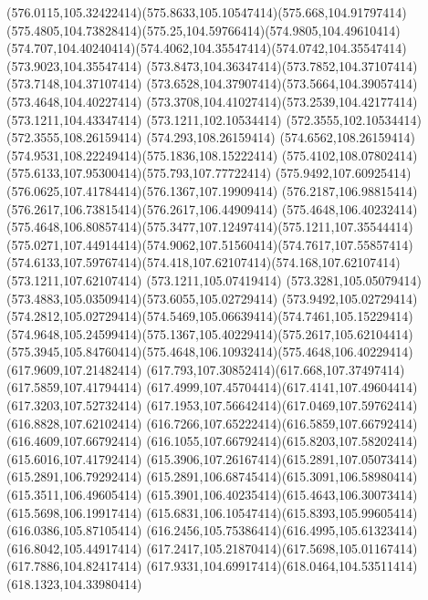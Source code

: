 {{	\curveto(576.0115,105.32422414)(575.8633,105.10547414)(575.668,104.91797414)
	\curveto(575.4805,104.73828414)(575.25,104.59766414)(574.9805,104.49610414)
	\curveto(574.707,104.40240414)(574.4062,104.35547414)(574.0742,104.35547414)
	\lineto(573.9023,104.35547414)
	\curveto(573.8473,104.36347414)(573.7852,104.37107414)(573.7148,104.37107414)
	\curveto(573.6528,104.37907414)(573.5664,104.39057414)(573.4648,104.40227414)
	\curveto(573.3708,104.41027414)(573.2539,104.42177414)(573.1211,104.43347414)
	\lineto(573.1211,102.10534414)
	\lineto(572.3555,102.10534414)
	\lineto(572.3555,108.26159414)
	\lineto(574.293,108.26159414)
	\curveto(574.6562,108.26159414)(574.9531,108.22249414)(575.1836,108.15222414)
	\curveto(575.4102,108.07802414)(575.6133,107.95300414)(575.793,107.77722414)
	\curveto(575.9492,107.60925414)(576.0625,107.41784414)(576.1367,107.19909414)
	\curveto(576.2187,106.98815414)(576.2617,106.73815414)(576.2617,106.44909414)
	\closepath
	\moveto(575.4648,106.40232414)
	\curveto(575.4648,106.80857414)(575.3477,107.12497414)(575.1211,107.35544414)
	\curveto(575.0271,107.44914414)(574.9062,107.51560414)(574.7617,107.55857414)
	\curveto(574.6133,107.59767414)(574.418,107.62107414)(574.168,107.62107414)
	\lineto(573.1211,107.62107414)
	\lineto(573.1211,105.07419414)
	\curveto(573.3281,105.05079414)(573.4883,105.03509414)(573.6055,105.02729414)
	\lineto(573.9492,105.02729414)
	\curveto(574.2812,105.02729414)(574.5469,105.06639414)(574.7461,105.15229414)
	\curveto(574.9648,105.24599414)(575.1367,105.40229414)(575.2617,105.62104414)
	\curveto(575.3945,105.84760414)(575.4648,106.10932414)(575.4648,106.40229414)
	\closepath
	\moveto(617.9609,107.21482414)
	\curveto(617.793,107.30852414)(617.668,107.37497414)(617.5859,107.41794414)
	\curveto(617.4999,107.45704414)(617.4141,107.49604414)(617.3203,107.52732414)
	\curveto(617.1953,107.56642414)(617.0469,107.59762414)(616.8828,107.62102414)
	\curveto(616.7266,107.65222414)(616.5859,107.66792414)(616.4609,107.66792414)
	\curveto(616.1055,107.66792414)(615.8203,107.58202414)(615.6016,107.41792414)
	\curveto(615.3906,107.26167414)(615.2891,107.05073414)(615.2891,106.79292414)
	\curveto(615.2891,106.68745414)(615.3091,106.58980414)(615.3511,106.49605414)
	\curveto(615.3901,106.40235414)(615.4643,106.30073414)(615.5698,106.19917414)
	\curveto(615.6831,106.10547414)(615.8393,105.99605414)(616.0386,105.87105414)
	\curveto(616.2456,105.75386414)(616.4995,105.61323414)(616.8042,105.44917414)
	\curveto(617.2417,105.21870414)(617.5698,105.01167414)(617.7886,104.82417414)
	\curveto(617.9331,104.69917414)(618.0464,104.53511414)(618.1323,104.33980414)
}}
